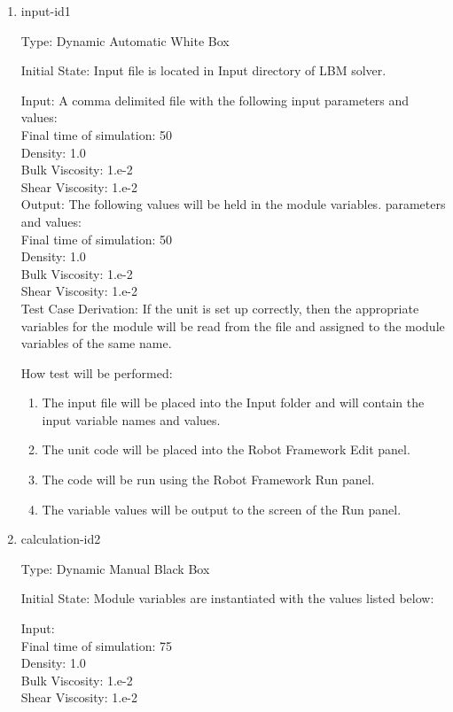 \documentclass[12pt, titlepage]{article}
\begin{document}
\begin{enumerate}

\item{input-id1\\}

Type: Dynamic Automatic White Box
					
Initial State: Input file is located in Input directory of LBM solver.
					
Input: A comma delimited file with the following input parameters and values:\\
Final time of simulation: 50\\
Density: 1.0\\
Bulk Viscosity: 1.e-2\\
Shear Viscosity: 1.e-2\\
					
Output: The following values will be held in the module variables.
parameters and values:\\
Final time of simulation: 50\\
Density: 1.0\\
Bulk Viscosity: 1.e-2\\
Shear Viscosity: 1.e-2\\

Test Case Derivation: If the unit is set up correctly, then the appropriate variables for the module will be read from the file and assigned to the module variables of the same name.

How test will be performed: 
\begin{enumerate}
\item The input file will be placed into the Input folder and will contain the input variable names and values.
\item The unit code will be placed into the Robot Framework Edit panel.
\item The code will be run using the Robot Framework Run panel.
\item The variable values will be output to the screen of the Run panel.
\end{enumerate}
					
\item{calculation-id2\\}

Type: Dynamic Manual Black Box
					
Initial State: Module variables are instantiated with the values listed below:
					
Input: \\
Final time of simulation: 75\\
Density: 1.0\\
Bulk Viscosity: 1.e-2\\
Shear Viscosity: 1.e-2\\
					

\end{enumerate}
\end{document}
